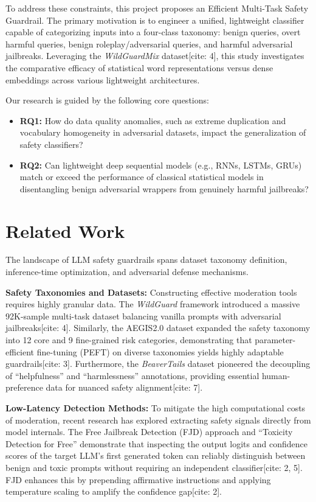 \documentclass[11pt]{article}
\begin{document}
To address these constraints, this project proposes an Efficient Multi-Task Safety Guardrail. The primary motivation is to engineer a unified, lightweight classifier capable of categorizing inputs into a four-class taxonomy: benign queries, overt harmful queries, benign roleplay/adversarial queries, and harmful adversarial jailbreaks. Leveraging the \textit{WildGuardMix} dataset[cite: 4], this study investigates the comparative efficacy of statistical word representations versus dense embeddings across various lightweight architectures.

Our research is guided by the following core questions:
\begin{itemize}
    \item \textbf{RQ1:} How do data quality anomalies, such as extreme duplication and vocabulary homogeneity in adversarial datasets, impact the generalization of safety classifiers?
    \item \textbf{RQ2:} Can lightweight deep sequential models (e.g., RNNs, LSTMs, GRUs) match or exceed the performance of classical statistical models in disentangling benign adversarial wrappers from genuinely harmful jailbreaks?
\end{itemize}

\section{Related Work}
The landscape of LLM safety guardrails spans dataset taxonomy definition, inference-time optimization, and adversarial defense mechanisms.

\textbf{Safety Taxonomies and Datasets:} Constructing effective moderation tools requires highly granular data. The \textit{WildGuard} framework introduced a massive 92K-sample multi-task dataset balancing vanilla prompts with adversarial jailbreaks[cite: 4]. Similarly, the AEGIS2.0 dataset expanded the safety taxonomy into 12 core and 9 fine-grained risk categories, demonstrating that parameter-efficient fine-tuning (PEFT) on diverse taxonomies yields highly adaptable guardrails[cite: 3]. Furthermore, the \textit{BeaverTails} dataset pioneered the decoupling of ``helpfulness'' and ``harmlessness'' annotations, providing essential human-preference data for nuanced safety alignment[cite: 7].

\textbf{Low-Latency Detection Methods:} To mitigate the high computational costs of moderation, recent research has explored extracting safety signals directly from model internals. The Free Jailbreak Detection (FJD) approach and ``Toxicity Detection for Free'' demonstrate that inspecting the output logits and confidence scores of the target LLM's first generated token can reliably distinguish between benign and toxic prompts without requiring an independent classifier[cite: 2, 5]. FJD enhances this by prepending affirmative instructions and applying temperature scaling to amplify the confidence gap[cite: 2].
\end{document}
